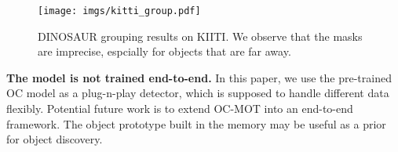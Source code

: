 \begin{figure}[!h]
	\centering
	\texttt{[image: imgs/kitti\_group.pdf]}
\caption{DINOSAUR grouping results on KIITI. We observe that the masks are imprecise, espcially for objects that are far away.
 }
 \vspace{-2mm}
\label{fig:kitti}
\end{figure}

\vspace{+2.5mm}
\noindent\textbf{The model is not trained end-to-end.}
In this paper, we use the pre-trained OC model as a plug-n-play detector, which is supposed to handle different data flexibly. Potential future work is to extend OC-MOT into an end-to-end framework. The object prototype built in the memory may be useful as a prior for object discovery.